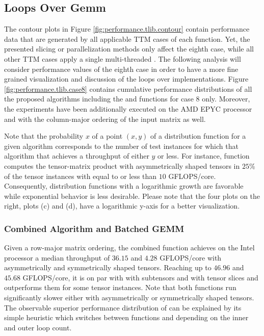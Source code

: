 
\subsection{Loops Over Gemm}
The contour plots in Figure \ref{fig:performance.tlib.contour} contain performance data that are generated by all applicable TTM cases of each  function.
Yet, the presented slicing or parallelization methods only affect the eighth case, while all other TTM cases apply a single multi-threaded .
The following analysis will consider performance values of the eighth case in order to have a more fine grained visualization and discussion of the loops over  implementations.
Figure \ref{fig:performance.tlib.case8} contains cumulative performance distributions of all the proposed algorithms including the   and  functions for case 8 only.
Moreover, the experiments have been additionally executed on the AMD EPYC processor and with the column-major ordering of the input matrix as well.

Note that the probability $x$ of a point $(x,y)$ of a distribution function for a given algorithm corresponds to the number of test instances for which that algorithm that achieves a throughput of either $y$ or less.
For instance, function  computes the tensor-matrix product with asymmetrically shaped tensors in $25$\% of the tensor instances with equal to or less than $10$ GFLOPS/core.
Consequently, distribution functions with a logarithmic growth are favorable while exponential behavior is less desirable.
Please note that the four plots on the right, plots (c) and (d), have a logarithmic y-axis for a better visualization.


\subsubsection{Combined Algorithm and Batched GEMM}
Given a row-major matrix ordering, the combined function  achieves on the Intel processor a median throughput of $36.15$ and $4.28$ GFLOPS/core with asymmetrically and symmetrically shaped tensors.
Reaching up to $46.96$ and $45.68$ GFLOPS/core, it is on par with  with subtensors and  with tensor slices and outperforms them for some tensor instances.
Note that both functions run significantly slower either with asymmetrically or symmetrically shaped tensors.
The observable superior performance distribution of  can be explained by its simple heuristic which switches between functions  and  depending on the inner and outer loop count.

